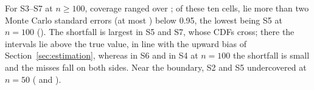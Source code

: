\documentclass[AMA,Times1COL]{WileyNJDv5}
\begin{document}
For S3--S7 at $n \geq 100$, coverage ranged over ; of these ten cells,  lie more than two Monte Carlo standard errors (at most ) below 0.95, the lowest being S5 at $n = 100$ (). The shortfall is largest in S5 and S7, whose CDFs cross; there the intervals lie above the true value, in line with the upward bias of Section~\ref{sec:estimation}, whereas in S6 and in S4 at $n = 100$ the shortfall is small and the misses fall on both sides. Near the boundary, S2 and S5 undercovered at $n = 50$ ( and ).
\end{document}
